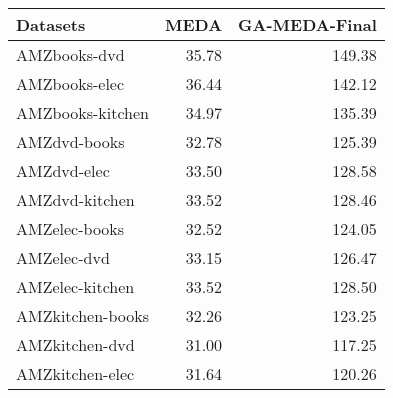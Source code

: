 \documentclass[a4paper]{article}
\begin{document}
\begin{tabular}{lrr}
	\toprule
	Datasets &   MEDA &  GA-MEDA-Final \\
	\midrule
	AMZbooks-dvd &  35.78 &         149.38 \\
	AMZbooks-elec &  36.44 &         142.12 \\
	AMZbooks-kitchen &  34.97 &         135.39 \\
	AMZdvd-books &  32.78 &         125.39 \\
	AMZdvd-elec &  33.50 &         128.58 \\
	AMZdvd-kitchen &  33.52 &         128.46 \\
	AMZelec-books &  32.52 &         124.05 \\
	AMZelec-dvd &  33.15 &         126.47 \\
	AMZelec-kitchen &  33.52 &         128.50 \\
	AMZkitchen-books &  32.26 &         123.25 \\
	AMZkitchen-dvd &  31.00 &         117.25 \\
	AMZkitchen-elec &  31.64 &         120.26 \\
	\bottomrule
\end{tabular}
\end{document}
